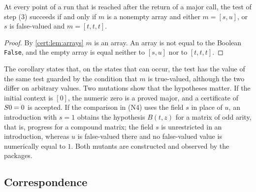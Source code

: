 \begin{corollary}\label{cert:cor:matcher}
At every point of a run that is reached after the return of a major call, the
test of step (3) succeeds if and only if $m$ is a nonempty array and either
$m=[s,u]$, or $s$ is false-valued and $m=[t,t,t]$.
\end{corollary}
\begin{proof}
By \cref{cert:lem:arrays} $m$ is an array. An array is not equal to the
Boolean \texttt{False}, and the empty array is equal neither to $[s,u]$ nor to
$[t,t,t]$.
\end{proof}

The corollary states that, on the states that can occur, the test has the
value of the same test guarded by the condition that $m$ is true-valued,
although the two differ on arbitrary values. Two mutations show that the
hypotheses matter. If the initial context is $[0]$, the numeric zero is a
proved major, and a certificate of $S 0=0$ is accepted. If the comparison
in (N4) uses the field $s$ in place of $u$, an introduction with $s=1$ obtains
the hypothesis $B(t,z)$ for a matrix of odd arity, that is, progress for a
compound matrix; the field $s$ is unrestricted in an introduction, whereas
$u$ is false-valued there and no false-valued value is numerically equal to
$1$. Both mutants are constructed and observed by the packages.

\subsection{Correspondence}

